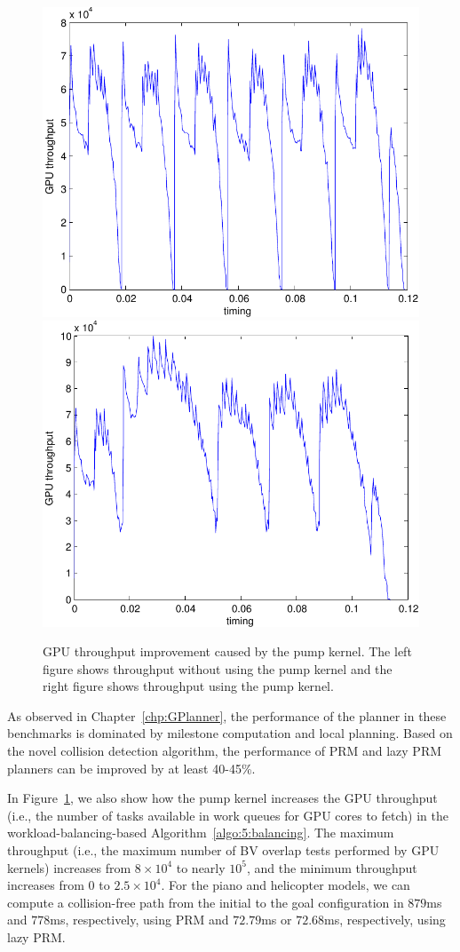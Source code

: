 \begin{figure}[!h]
  \centering
  \includegraphics[width=0.8\linewidth]{figs/5/nopump.pdf}
  \includegraphics[width=0.8\linewidth]{figs/5/pump.pdf}
  \caption[GPU throughput improvement caused by pump kernel]{GPU throughput improvement caused by the pump kernel. The left figure shows throughput without using the pump kernel
  and the right figure shows throughput using the pump kernel.}
  \label{fig:5:pump}
\end{figure}

As observed in Chapter~\ref{chp:GPlanner}, the performance of the planner in these benchmarks is
dominated by milestone computation and local planning. Based on the novel collision detection algorithm, the performance of PRM
and lazy PRM planners can be improved by at least 40-45\%.

In Figure~\ref{fig:5:pump}, we also show how the pump kernel increases the GPU throughput (i.e., the number of
tasks available in work queues for GPU cores to fetch) in the workload-balancing-based Algorithm~\ref{algo:5:balancing}.
The maximum throughput (i.e., the maximum number of BV overlap tests performed by GPU kernels) increases from $8\times 10^4$
to nearly $10^5$, and the minimum throughput increases from $0$ to $2.5\times 10^4$. For the piano and helicopter models,
we can compute a collision-free path from the initial to the goal configuration in $879$ms and $778$ms, respectively,
using PRM and $72.79$ms or $72.68$ms, respectively, using lazy PRM.


